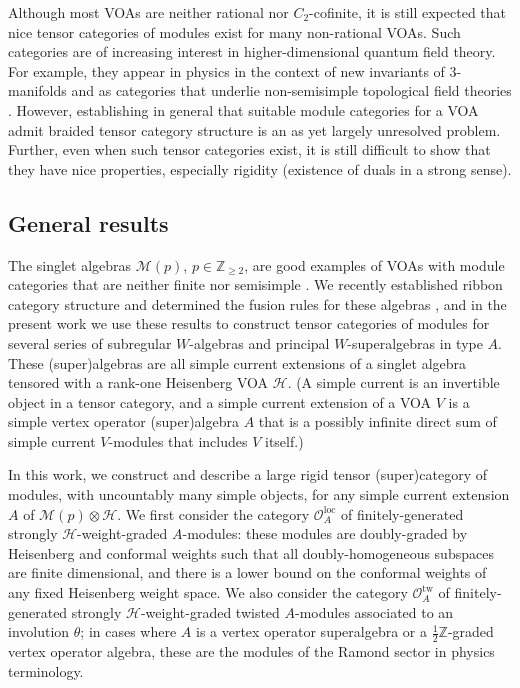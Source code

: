 \documentclass[11pt, reqno]{amsart}
\theoremstyle{definition}\newtheorem{defi}[thm]{Definition}
\theoremstyle{definition}\newtheorem{rem}[thm]{Remark}
\theoremstyle{definition}\newtheorem{exam}[thm]{Example}
\theoremstyle{definition}\newtheorem{assum}[thm]{Assumption}
\newcommand{\cH}{\mathcal{H}}
\newcommand{\cM}{\mathcal{M}}
\newcommand{\cO}{\mathcal{O}}
\newcommand{\ZZ}{\mathbb{Z}}
\newcommand{\Oloc}{\cO^{\mathrm{loc}}}
\newcommand{\Otw}{\cO^{\mathrm{tw}}}
\begin{document}
Although most VOAs are neither rational nor $C_2$-cofinite, it is still expected that nice tensor categories of modules exist for many non-rational VOAs. Such categories are of increasing interest in higher-dimensional quantum field theory. For example, 
they appear in physics in the context of new invariants of $3$-manifolds  \cite{Cheng} and as categories that underlie non-semisimple topological field theories \cite{CGP, CDGG}. However, establishing in general that suitable module categories for a VOA admit braided tensor category structure is an as yet largely unresolved problem. Further, even when such tensor categories exist, it is still difficult to show that they have nice properties, especially rigidity (existence of duals in a strong sense).

\subsection{General results}

The singlet algebras $\cM(p)$, $p \in \mathbb Z_{\geq 2}$, are good examples of VOAs with module categories that are neither finite nor semisimple \cite{Ad}. We recently established ribbon category structure and determined the fusion rules for these algebras \cite{CMY-singlet, CMY-singlet-typical}, and in the present work we use these results to construct tensor categories of modules for several series of subregular $W$-algebras  and principal $W$-superalgebras in type $A$. These (super)algebras are all simple current extensions of a singlet algebra tensored with a rank-one Heisenberg VOA $\cH$. (A simple current is an invertible object in a tensor category, and a simple current extension of a VOA $V$ is a simple vertex operator (super)algebra $A$ that is a possibly infinite direct sum of simple current $V$-modules that includes $V$ itself.)

In this work, we construct and describe a large rigid tensor (super)category of modules, with uncountably many simple objects, for any simple current extension $A$ of $\cM(p) \otimes \cH$. We first consider the category $\Oloc_A$ of finitely-generated strongly $\cH$-weight-graded $A$-modules: these modules are doubly-graded by Heisenberg and conformal weights such that all doubly-homogeneous subspaces are finite dimensional, and there is a lower bound on the conformal weights of any fixed Heisenberg weight space. We also consider the category $\Otw_A$ of finitely-generated strongly $\cH$-weight-graded twisted $A$-modules associated to an involution $\theta$; in cases where $A$ is a vertex operator superalgebra or a $\frac{1}{2}\ZZ$-graded vertex operator algebra, these are the modules of the Ramond sector in physics terminology.
\end{document}
